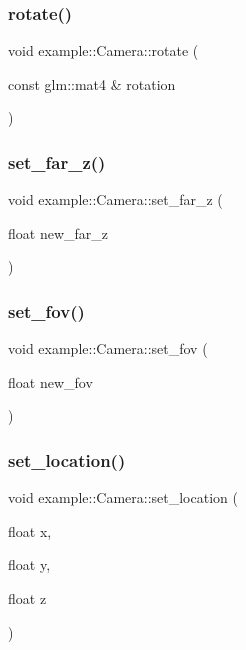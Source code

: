 \mbox{\label{classexample_1_1_camera_af87e314b23ccc6462b27985eb1d648b4}} 
\subsubsection{rotate()}
{\footnotesize\ttfamily void example\+::\+Camera\+::rotate (\begin{DoxyParamCaption}\item[{const glm\+::mat4 \&}]{rotation }\end{DoxyParamCaption})\hspace{0.3cm}{\ttfamily [inline]}}

\mbox{\label{classexample_1_1_camera_a3121b4ab410738a97cb36ea37bb38a65}} 
\subsubsection{set\_far\_z()}
{\footnotesize\ttfamily void example\+::\+Camera\+::set\+\_\+far\+\_\+z (\begin{DoxyParamCaption}\item[{float}]{new\+\_\+far\+\_\+z }\end{DoxyParamCaption})\hspace{0.3cm}{\ttfamily [inline]}}

\mbox{\label{classexample_1_1_camera_abd6281e8951e0080e41823e804f55bb5}} 
\subsubsection{set\_fov()}
{\footnotesize\ttfamily void example\+::\+Camera\+::set\+\_\+fov (\begin{DoxyParamCaption}\item[{float}]{new\+\_\+fov }\end{DoxyParamCaption})\hspace{0.3cm}{\ttfamily [inline]}}

\mbox{\label{classexample_1_1_camera_abcfe34f1adaf8be11c871ae8d9d10385}} 
\subsubsection{set\_location()}
{\footnotesize\ttfamily void example\+::\+Camera\+::set\+\_\+location (\begin{DoxyParamCaption}\item[{float}]{x,  }\item[{float}]{y,  }\item[{float}]{z }\end{DoxyParamCaption})\hspace{0.3cm}{\ttfamily [inline]}}

